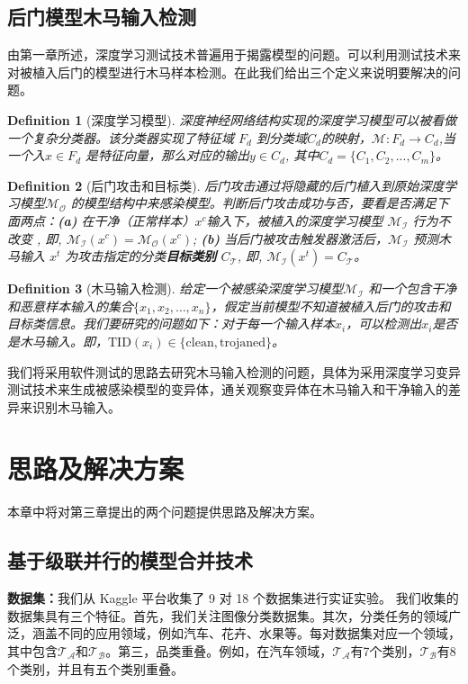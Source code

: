 \documentclass[fontset=macnew,UTF8]{article} %
\newtheorem{definition}{Definition}
\begin{document}
\subsection{后门模型木马输入检测}
由第一章所述，深度学习测试技术普遍用于揭露模型的问题。可以利用测试技术来对被植入后门的模型进行木马样本检测。在此我们给出三个定义来说明要解决的问题。

\begin{definition}[深度学习模型]
深度神经网络结构实现的深度学习模型可以被看做一个复杂分类器。该分类器实现了特征域 $F_d$ 到分类域$C_d$的映射，$\mathcal{M}: F_d\rightarrow C_d$,当一个入$x\in F_d$ 是特征向量，那么对应的输出$y\in C_d$, 其中$C_d=\{C_1,C_2,...,C_m\}$。
\end{definition}

\begin{definition}[后门攻击和目标类]
后门攻击通过将隐藏的后门植入到原始深度学习模型$\mathcal{M}_\mathcal{O}$ 的模型结构中来感染模型。判断后门攻击成功与否，要看是否满足下面两点：\textbf{(a)}
在干净（正常样本）$x^c$输入下，被植入的深度学习模型 $\mathcal{M}_\mathcal{I}$ 行为不改变 , 即, $\mathcal{M}_\mathcal{I}(x^c)=\mathcal{M}_\mathcal{O}(x^c)$; 
\textbf{(b)} 
当后门被攻击触发器激活后，$\mathcal{M}_\mathcal{I}$ 预测木马输入 $x^t$ 为攻击指定的分类\textbf{目标类别} $C_\mathcal{T}$, 即,  $\mathcal{M}_\mathcal{I}(x^t)=C_\mathcal{T}$。
\end{definition}

\begin{definition}[木马输入检测]
给定一个被感染深度学习模型$\mathcal{M}_\mathcal{I}$ 和一个包含干净和恶意样本输入的集合$\{x_1,x_2,\dots,x_n\}$，假定当前模型不知道被植入后门的攻击和目标类信息。我们要研究的问题如下：对于每一个输入样本${x_i}$，可以检测出$x_i$是否是木马输入。即，$\text{TID}(x_i)\in \{\text{clean},\text{trojaned}\}$。
\end{definition}

我们将采用软件测试的思路去研究木马输入检测的问题，具体为采用深度学习变异测试技术来生成被感染模型的变异体，通关观察变异体在木马输入和干净输入的差异来识别木马输入。


\section{思路及解决方案}
本章中将对第三章提出的两个问题提供思路及解决方案。

\subsection{基于级联并行的模型合并技术}
\textbf{数据集：}我们从 Kaggle 平台收集了 9 对 18 个数据集进行实证实验。 我们收集的数据集具有三个特征。首先，我们关注图像分类数据集。其次，分类任务的领域广泛，涵盖不同的应用领域，例如汽车、花卉、水果等。每对数据集对应一个领域，其中包含$\mathcal{T_A}$和$\mathcal{T_B}$。第三，品类重叠。例如，在汽车领域，$\mathcal{T_A}$有7个类别，$\mathcal{T_B}$有8个类别，并且有五个类别重叠。
\end{document}
